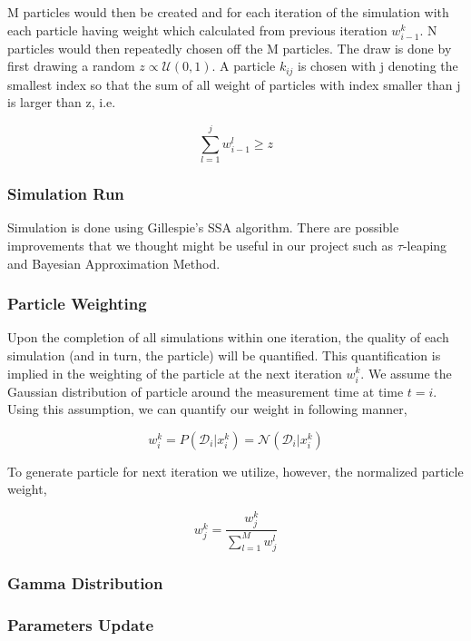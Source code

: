\documentclass[12pt, oneside]{article}
\begin{document}
M particles would then be created and for each iteration of the simulation with each particle having weight which calculated from previous iteration $w_{i - 1}^k$. N particles would then repeatedly chosen off the M particles. The draw is done by first drawing a random $z \propto \mathcal{U}(0, 1)$. A particle $k_{ij}$ is chosen with j denoting the smallest index so that the sum of all weight of particles with index smaller than j is larger than z, i.e.

$$\sum_{l=1}^{j} w_{i - 1}^l \geq z$$

\subsubsection{Simulation Run}

Simulation is done using Gillespie's SSA algorithm. There are possible improvements that we thought might be useful in our project such as $\tau$-leaping and Bayesian Approximation Method.

\subsubsection{Particle Weighting}

Upon the completion of all simulations within one iteration, the quality of each simulation (and in turn, the particle) will be quantified. This quantification is implied in the weighting of the particle at the next iteration $w_{i}^k$. We assume the Gaussian distribution of particle around the measurement time at time $t=i$. Using this assumption, we can quantify our weight in following manner,

$$w_i^k = P(\mathcal{D}_i | x_i^k) = \mathcal{N}(\mathcal{D}_i | x_i^k)$$

To generate particle for next iteration we utilize, however, the normalized particle weight,

$$w_j^k = \frac{w_j^k}{\sum_{l=1}^{M} w_{j}^l}$$

\subsubsection{Gamma Distribution}

\subsubsection{Parameters Update}
\end{document}
